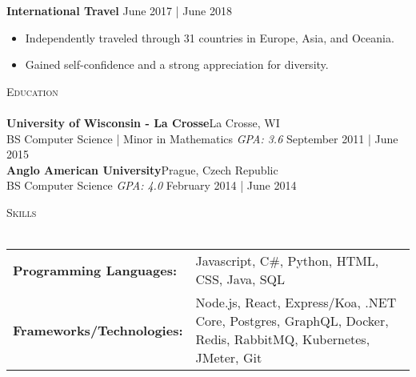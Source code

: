 \documentclass[a4paper]{article}
\newcommand{\lineunder} {
    \vspace*{-8pt} \\
    \hspace*{-18pt} \hrulefill \\
}
\newcommand{\header} [1] {
    {\hspace*{-18pt}\vspace*{6pt} \textsc{#1}}
    \vspace*{-6pt} \lineunder
}
\begin{document}
\textbf{International Travel} \hfill June 2017 | June 2018\\
\vspace{-1mm}
\begin{itemize} \itemsep 1pt
	\item Independently traveled through 31 countries in Europe, Asia, and Oceania.
	\item Gained self-confidence and a strong appreciation for diversity.
\end{itemize}

\header{Education}
\textbf{University of Wisconsin - La Crosse}\hfill La Crosse, WI\\
BS Computer Science | Minor in Mathematics \textit{GPA: 3.6} \hfill September 2011 | June 2015\\
\vspace{2mm}
\textbf{Anglo American University}\hfill Prague, Czech Republic\\
BS Computer Science \textit{GPA: 4.0} \hfill February 2014 | June 2014\\
\vspace{2mm}

\header{Skills}
\begin{tabularx}{\textwidth}{@{} p{150pt} P}
\textbf{Programming Languages:} & Javascript, C\#, Python, HTML, CSS, Java, SQL \\
\textbf{Frameworks/Technologies:} & Node.js, React, Express/Koa, .NET Core, Postgres, GraphQL, Docker, Redis, RabbitMQ, Kubernetes, JMeter, Git \\
\end{tabularx}
\vspace{2mm}
\end{document}
